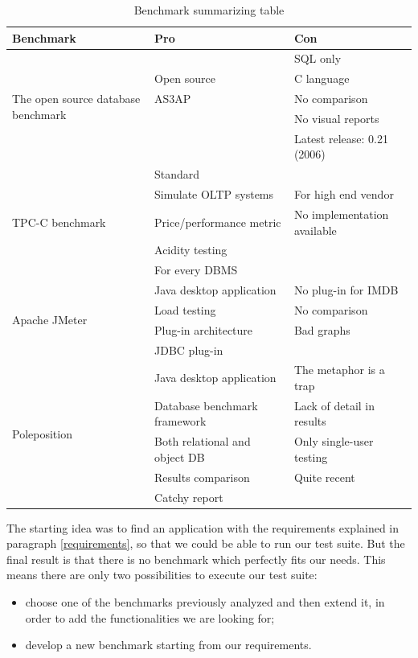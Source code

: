\begin{table}[htp!]
	\centering \footnotesize
	\begin{tabular}{| p{2.5cm} || p{5cm} | p{5cm} |} \hline
	
	Benchmark & Pro & Con \\ \hline \hline
	
	\multirow{5}{2.5cm}{The open source database benchmark} &  & SQL only \\
	& Open source & C language \\
	& AS3AP & No comparison \\
	&  & No visual reports \\
	&  & Latest release: 0.21 (2006) \\
	\hline
	
	\multirow{5}{2.5cm}{TPC-C benchmark} & Standard &  \\
	& Simulate OLTP systems & For high end vendor \\
	& Price/performance metric & No implementation available \\
	& Acidity testing &  \\
	& For every DBMS &  \\
	\hline
	
	\multirow{4}{2.5cm}{Apache JMeter} & Java desktop application & No plug-in for IMDB \\
	& Load testing & No comparison \\
	& Plug-in architecture & Bad graphs \\
	& JDBC plug-in &  \\
	\hline
	
	\multirow{5}{2.5cm}{Poleposition} & Java desktop application & The metaphor is a trap \\
	& Database benchmark framework & Lack of detail in results \\
	& Both relational and object DB & Only single-user testing \\
	& Results comparison & Quite recent \\
	& Catchy report &  \\
	\hline
		
	\end{tabular}
	\caption{Benchmark summarizing table}
	\label{benchmark-summarizing-table}
\end{table}

The starting idea was to find an application with the requirements explained in paragraph \ref{requirements}, so that we could be able to run our test suite. But the final result is that there is no benchmark which perfectly fits our needs. This means there are only two possibilities to execute our test suite:
\begin{itemize}
	\item choose one of the benchmarks previously analyzed and then extend it, in order to add the functionalities we are looking for;
	\item develop a new benchmark starting from our requirements.
\end{itemize}

